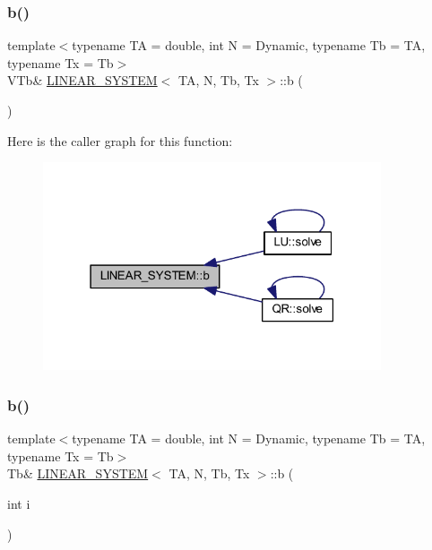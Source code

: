 \mbox{\label{class_l_i_n_e_a_r___s_y_s_t_e_m_a6754b4aaf5db40c45522d289e969f917}} 
\subsubsection{\texorpdfstring{b()}{b()}\hspace{0.1cm}{\footnotesize\ttfamily [1/2]}}
{\footnotesize\ttfamily template$<$typename TA = double, int N = Dynamic, typename Tb = TA, typename Tx = Tb$>$ \\
V\+Tb\& \mbox{\hyperlink{class_l_i_n_e_a_r___s_y_s_t_e_m}{L\+I\+N\+E\+A\+R\+\_\+\+S\+Y\+S\+T\+EM}}$<$ TA, N, Tb, Tx $>$\+::b (\begin{DoxyParamCaption}{ }\end{DoxyParamCaption})\hspace{0.3cm}{\ttfamily [inline]}}

Here is the caller graph for this function\+:
\nopagebreak
\begin{figure}[H]
\begin{center}
\leavevmode
\includegraphics[width=283pt]{class_l_i_n_e_a_r___s_y_s_t_e_m_a6754b4aaf5db40c45522d289e969f917_icgraph}
\end{center}
\end{figure}
\mbox{\label{class_l_i_n_e_a_r___s_y_s_t_e_m_ae7c2a505d8cd0c6eb4b49bc0ece4e233}} 
\subsubsection{\texorpdfstring{b()}{b()}\hspace{0.1cm}{\footnotesize\ttfamily [2/2]}}
{\footnotesize\ttfamily template$<$typename TA = double, int N = Dynamic, typename Tb = TA, typename Tx = Tb$>$ \\
Tb\& \mbox{\hyperlink{class_l_i_n_e_a_r___s_y_s_t_e_m}{L\+I\+N\+E\+A\+R\+\_\+\+S\+Y\+S\+T\+EM}}$<$ TA, N, Tb, Tx $>$\+::b (\begin{DoxyParamCaption}\item[{int}]{i }\end{DoxyParamCaption})\hspace{0.3cm}{\ttfamily [inline]}}

